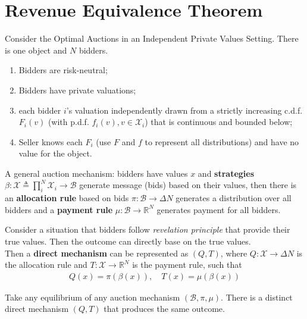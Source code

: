 \documentclass[11pt]{elegantbook}
\begin{document}
\section{Revenue Equivalence Theorem}
Consider the Optimal Auctions in an Independent Private Values Setting. There is one object and $N$ bidders.
\begin{enumerate}
    \item Bidders are risk-neutral;
    \item Bidders have private valuations;
    \item each bidder $i$'s valuation independently drawn from a strictly increasing c.d.f. $F_i(v)$ (with p.d.f. $f_i(v),v\in \mathcal{X}_i$) that is continuous and bounded below;
    \item Seller knows each $F_i$ (use $F$ and $f$ to represent all distributions) and have no value for the object.
\end{enumerate}

\begin{definition}
    \normalfont
    A general auction mechanism: bidders have values $x$ and \textbf{strategies} $\beta: \mathcal{X}\triangleq \prod_i^N \mathcal{X}_i \rightarrow \mathcal{B}$ generate message (bids) based on their values, then there is an \textbf{allocation rule} based on bids $\pi: \mathcal{B} \rightarrow \Delta N$ generates a distribution over all bidders and a \textbf{payment rule} $\mu: \mathcal{B} \rightarrow \mathbb{R}^N$ generates payment for all bidders.
\end{definition}

\begin{definition}
    \normalfont
    Consider a situation that bidders follow \textit{revelation principle} that provide their true values. Then the outcome can directly base on the true values.\\
    Then a \textbf{direct mechanism} can be represented as $(Q,T)$, where $Q: \mathcal{X} \rightarrow \Delta N$ is the allocation rule and $T: \mathcal{X} \rightarrow \mathbb{R}^N$ is the payment rule, such that
    \begin{equation}
        \begin{aligned}
            Q(x)=\pi(\beta(x)),\quad T(x)=\mu(\beta(x))
        \end{aligned}
        \nonumber
    \end{equation}
\end{definition}

\begin{proposition}
    Take any equilibrium of any auction mechanism $(\mathcal{B},\pi,\mu)$. There is a distinct direct mechanism $(Q,T)$ that produces the same outcome.
\end{proposition}
\end{document}
